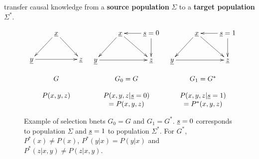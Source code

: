 transfer causal knowledge from
a {\bf source population} $\Sigma$ to a 
{\bf target population} $\Sigma^*$.


\begin{figure}
$$
\begin{array}{ccc}
\xymatrix{
&\rvx\ar[dl]\ar[dr]
\\
\rvy\ar[rr]
&&\rvz
}
&
\xymatrix{
&\rvx\ar[dl]\ar[dr]
&\rvs=0\ar[l]\ar[d]
\\
\rvy\ar[rr]
&&\rvz
}
&
\xymatrix{
&\rvx\ar[dl]\ar[dr]
&\rvs=1\ar[l]\ar[d]
\\
\rvy\ar[rr]
&&\rvz
}
\\
\\
G&G_0=G
&G_1=G^*
\\
\\
P(x,y,z)
&P(x,y,z|\rvs=0)
&P(x,y,z|\rvs=1)
\\
&
=P(x,y,z)
&
=P^*(x,y,z)
\end{array}
$$
\caption{Example of selection bnets
$G_0=G$ and $G_1=G^*$.
${\underline{s}}=0$ corresponds to population $\Sigma$
and ${\underline{s}}=1$ to population $\Sigma^*$.
For $G^*$, 
$P^*(x)\neq P(x)$, $P^*(y|x)=P(y|x)$
and $P^*(z|x,y)\neq P(z|x,y)$.}
\label{fig-sel-dia}
\end{figure}